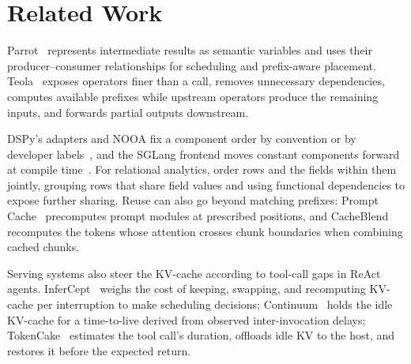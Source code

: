\section{Related Work}
\label{sec:related_works}
 Parrot~\cite{lin2024parrot} represents intermediate results as semantic variables and uses their producer--consumer relationships for scheduling and prefix-aware placement. Teola~\cite{tan2025teola} exposes operators finer than a call, removes unnecessary dependencies, computes available prefixes while upstream operators produce the remaining inputs, and forwards partial outputs downstream. 

 DSPy's adapters and NOOA fix a component order by convention or by developer labels~\cite{dspy2026chatadapter,furgale2026nooa}, and the SGLang frontend moves constant components forward at compile time~\cite{zheng2024sglang}. For relational analytics, \citet{liu2025optimizing} order rows and the fields within them jointly, grouping rows that share field values and using functional dependencies to expose further sharing. Reuse can also go beyond matching prefixes: Prompt Cache~\cite{gim2024promptcache} precomputes prompt modules at prescribed positions, and CacheBlend~\cite{yao2025cacheblend} recomputes the tokens whose attention crosses chunk boundaries when combining cached chunks.

 Serving systems also steer the KV-cache according to tool-call gaps in ReAct agents. InferCept~\cite{abhyankar2024infercept} weighs the cost of keeping, swapping, and recomputing KV-cache per interruption to make scheduling decisions; Continuum~\cite{li2025continuum} holds the idle KV-cache for a time-to-live derived from observed inter-invocation delays; TokenCake~\cite{bian2026tokencake} estimates the tool call's duration, offloads idle KV to the host, and restores it before the expected return. 
